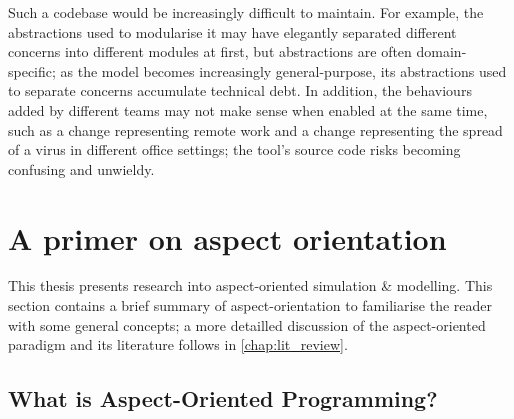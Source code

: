 Such a codebase would be increasingly difficult to maintain. For example, the
abstractions used to modularise it may have elegantly separated different
concerns into different modules at first, but abstractions are often
domain-specific; as the model becomes increasingly general-purpose, its
abstractions used to separate concerns accumulate technical debt. In addition,
the behaviours added by different teams may not make sense when enabled at the
same time, such as a change representing remote work and a change representing
the spread of a virus in different office settings; the tool's source code risks
becoming confusing and unwieldy.






\section{A primer on aspect orientation}

This thesis presents research into aspect-oriented simulation \& modelling. This
section contains a brief summary of aspect-orientation to familiarise the reader
with some general concepts; a more detailled discussion of the aspect-oriented
paradigm and its literature follows in \cref{chap:lit_review}.

\subsection{What is Aspect-Oriented Programming?}


